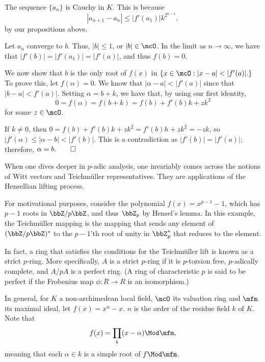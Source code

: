\documentclass[a4paper, 12pt,oneside,openany]{book}
\begin{document}
The sequence $\{a_n\}$ is Cauchy in $K$. This is because $$|a_{n+1}-a_n| \leq |f'(a_1)| k^{2^{n-1}},$$ by our propositions above.

Let $a_n$ converge to $b$. Thus, $|b| \leq 1$, or $|b| \in \mcO$. In the limit as $n \to \infty$, we have that $|f'(b)|=|f'(a_1)|=|f'(a)|$, and thus $f(b)=0.$

We now show that $b$ is the only root of $f(x)$ in $\{x \in \mcO: |x-a| < |f'(a)|.\}$ To prove this, let $f(\alpha)=0$. We know that $|\alpha-a|<|f'(a)|$ since that $|b-a|<f'(a)|$. Setting $\alpha=b+k$, we have that, by using our first identity, $$0=f(\alpha)=f(b+k)=f(b)+f'(b)k+zk^2$$ for some $z \in \mcO$. 

If $k\neq 0$, then $0=f(b)+f'(b)k+zk^2=f'(b)h+zk^2=-zk$, so $|f'(\alpha)\leq |\alpha-b|<|f'(b)|$. This is a contradiction as $|f'(b)|=|f'(a)|$; therefore, $\alpha=b. \qed$ 

When one dives deeper in $p$-adic analysis, one invariably comes across the notions of Witt vectors and Teichmüller representatives. They are applications of the Hensellian lifting process. 

For motivational purposes, consider the polynomial $f(x)=x^{p-1}-1$, which has $p-1$ roots in $\bbZ/p\bbZ$, and thus $\bbZ_p$ by Hensel's lemma. In this example, the Teichmüller mapping is the mapping that sends any element of $(\bbZ/p\bbZ)^*$ to the $p-1$'th root of unity in $\bbZ_p^*$ that reduces to the element. 


In fact, a ring that satisfies the conditions for the Teichmüller lift is known as a strict $p$-ring. More specifically, $A$ is a strict $p$-ring if it is $p$-torsion free, $p$-adically complete, and $A/pA$ is a perfect ring. (A ring of characteristic $p$ is said to be perfect if the Frobenius map $\phi: R\to R$ is an isomorphism.)

In general, for $K$ a non-archimedean local field, $\mcO$ its valuation ring and $\mfm$ its maximal ideal, let $f(x)=x^n-x$. $n$ is the order of the residue field $k$ of $K$. Note that $$f(x)=\prod\limits_k (x-\alpha) \Mod \mfm,$$ meaning that each $\alpha\in k$ is a simple root of $f \Mod \mfm$. 
\end{document}
